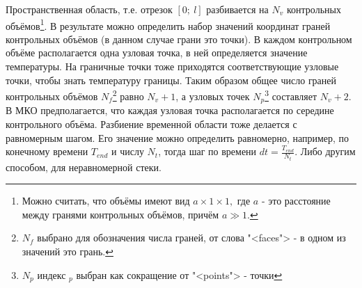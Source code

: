 \documentclass[oneside, final, 14pt]{report}
\begin{document}
Пространственная область, т.е. отрезок $[0;\ l]$ разбивается на $N_v$ контрольных объёмов\footnote{Можно считать, что объёмы имеют вид $a\times 1\times 1,$ где $a$ - это расстояние между гранями контрольных объёмов, причём $a \gg 1$.}. В результате можно определить набор значений координат граней контрольных объёмов (в данном случае грани это точки). В каждом контрольном объёме располагается одна узловая точка, в ней определяется значение температуры. На граничные точки тоже приходятся соответствующие узловые точки, чтобы знать температуру границы. Таким образом общее число граней контрольных объёмов $N_f$\footnote{$N_f$ выбрано для обозначения числа граней, от слова "<faces"> - в одном из значений это грань.} равно $N_v + 1$, а узловых точек $N_p$\footnote{$N_p$ индекс $_p$ выбран как сокращение от "<points"> - точки} составляет $N_v + 2$. В МКО предполагается, что каждая узловая точка располагается по середине контрольного объёма. Разбиение временной области тоже делается с равномерным шагом. Его значение можно определить равномерно, например, по конечному времени $T_{end}$ и числу $N_t$, тогда шаг по времени $dt = \frac{T_{end}}{N_t}$. Либо другим способом, для неравномерной стеки. 
\end{document}
